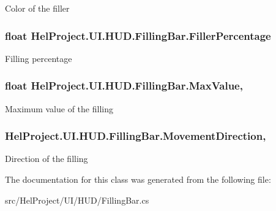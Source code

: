 Color of the filler 

\hypertarget{class_hel_project_1_1_u_i_1_1_h_u_d_1_1_filling_bar_a2108e1a6e7db2b7be67e30ac313e2699}{}
\subsubsection[{Filler\+Percentage}]{\setlength{\rightskip}{0pt plus 5cm}float Hel\+Project.\+U\+I.\+H\+U\+D.\+Filling\+Bar.\+Filler\+Percentage\hspace{0.3cm}{\ttfamily [get]}}\label{class_hel_project_1_1_u_i_1_1_h_u_d_1_1_filling_bar_a2108e1a6e7db2b7be67e30ac313e2699}


Filling percentage 

\hypertarget{class_hel_project_1_1_u_i_1_1_h_u_d_1_1_filling_bar_a40b9eda50476a7b3e82084f500c704c7}{}
\subsubsection[{Max\+Value}]{\setlength{\rightskip}{0pt plus 5cm}float Hel\+Project.\+U\+I.\+H\+U\+D.\+Filling\+Bar.\+Max\+Value\hspace{0.3cm}{\ttfamily [get]}, {\ttfamily [set]}}\label{class_hel_project_1_1_u_i_1_1_h_u_d_1_1_filling_bar_a40b9eda50476a7b3e82084f500c704c7}


Maximum value of the filling 

\hypertarget{class_hel_project_1_1_u_i_1_1_h_u_d_1_1_filling_bar_ab404ab107fd3d2dde3cfde5ae09b1b81}{}
\subsubsection[{Movement\+Direction}]{ Hel\+Project.\+U\+I.\+H\+U\+D.\+Filling\+Bar.\+Movement\+Direction\hspace{0.3cm}{\ttfamily [get]}, {\ttfamily [set]}}\label{class_hel_project_1_1_u_i_1_1_h_u_d_1_1_filling_bar_ab404ab107fd3d2dde3cfde5ae09b1b81}


Direction of the filling 



The documentation for this class was generated from the following file\+:\begin{DoxyCompactItemize}
\item 
src/\+Hel\+Project/\+U\+I/\+H\+U\+D/Filling\+Bar.\+cs\end{DoxyCompactItemize}
